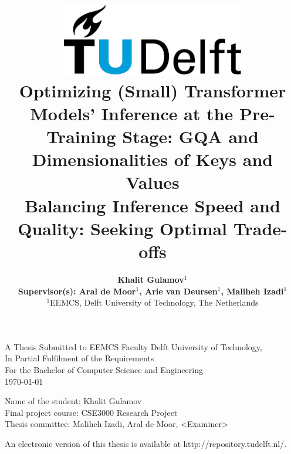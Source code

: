 \title{
    \includegraphics[width=8cm, keepaspectratio]{tudelftlogo.png}\\
    \vspace*{2cm}
    \textbf{
        Optimizing (Small) Transformer Models' Inference at the Pre-Training Stage: GQA and Dimensionalities of Keys and Values  \\
        {\large Balancing Inference Speed and Quality: Seeking Optimal Trade-offs}
    }\\
    \vspace*{1cm}
}

\author{
    \textbf{
    Khalit Gulamov$^1$}\\
    \hfill \break
    \textbf{Supervisor(s): Aral de Moor$^1$, Arie van Deursen$^1$, Maliheh Izadi$^1$ }\\
    \break
    {\large 
        \hfill \break
        $^1$EEMCS, Delft University of Technology, The Netherlands
    }\\
}

\date{}

\maketitle
\thispagestyle{empty}

\let\clearpagebackup\clearpage
\renewcommand{\clearpage}{ }

\onecolumn

\vspace*{1.5cm}
\begin{center}
    A Thesis Submitted to EEMCS Faculty Delft University of Technology,\\
    In Partial Fulfilment of the Requirements\\
    For the Bachelor of Computer Science and Engineering\\
    \today
\end{center}

\vspace*{2cm}

\noindent
{\small
Name of the student:  Khalit Gulamov\\
Final project course: CSE3000 Research Project\\
Thesis committee: Maliheh Izadi, Aral de Moor, \textless Examiner\textgreater\\
}
\vfill

\begin{center}
    An electronic version of this thesis is available at http://repository.tudelft.nl/.
\end{center}

\twocolumn
\let\clearpage\clearpagebackup  
\clearpage
\setcounter{page}{1}
